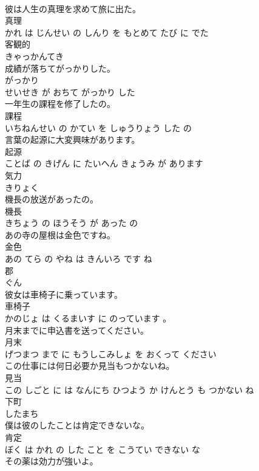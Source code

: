 \documentclass[8pt]{extreport}
\begin{document}
\begin{CJK}{UTF8}{min}
\\	彼は人生の真理を求めて旅に出た。	
\\	真理 
\\	かれ は じんせい の しんり を もとめて たび に でた			
\\	客観的	
\\	きゃっかんてき			
\\	成績が落ちてがっかりした。	
\\	がっかり 
\\	せいせき が おちて がっかり した			
\\	一年生の課程を修了したの。	
\\	課程 
\\	いちねんせい の かてい を しゅうりょう した の			
\\	言葉の起源に大変興味があります。	
\\	起源 
\\	ことば の きげん に たいへん きょうみ が あります			
\\	気力	
\\	きりょく			
\\	機長の放送があったの。	
\\	機長 
\\	きちょう の ほうそう が あった の			
\\	あの寺の屋根は金色ですね。	
\\	金色 
\\	あの てら の やね は きんいろ です ね			
\\	郡	
\\	ぐん			
\\	彼女は車椅子に乗っています。	
\\	車椅子 
\\	かのじょ は くるまいす に のっています 。			
\\	月末までに申込書を送ってください。	
\\	月末 
\\	げつまつ まで に もうしこみしょ を おくって ください			
\\	この仕事には何日必要か見当もつかないね。	
\\	見当 
\\	この しごと に は なんにち ひつよう か けんとう も つかない ね			
\\	下町	
\\	したまち			
\\	僕は彼のしたことは肯定できないな。	
\\	肯定 
\\	ぼく は かれ の した こと を こうてい できない な			
\\	その薬は効力が強いよ。	

\end{CJK}
\end{document}
